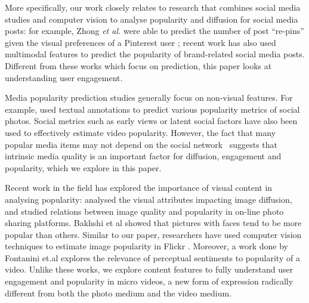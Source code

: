 More specifically, our work closely relates to research that combines social media studies and computer vision to analyse popularity and diffusion for social media posts: for example, Zhong \textsl{et al.} were able to predict the number of post ``re-pins''  given the visual preferences of a Pinterest user \cite{predictingPintrest}; recent work \cite{Mazloom:2016:MPP:2964284.2967210} has also used multimodal features to predict the popularity of brand-related social media posts. Different from these works which focus on prediction,  this paper looks at understanding user engagement. 

Media popularity prediction studies generally focus on non-visual features.  For example, \cite{Yamasaki:2014} used textual annotations to predict various popularity metrics of social photos. Social metrics such as early views \cite{pinto2013using} or latent social factors \cite{nwana2013latent} have also been used to effectively estimate video popularity. However, the fact that many popular media items may not depend on the social  network~\cite{Cha2009Flickr} suggests that intrinsic media quality is an important factor for diffusion, engagement and popularity, which we explore in this paper.

Recent work in the field has explored the importance of visual content in analysing popularity: \cite{totti14impact} analysed the visual attributes impacting image diffusion,  and \cite{schifanella2015image} studied relations between image quality and popularity in on-line photo sharing platforms.  Bakhshi et al  \cite{bakhshi2014faces} showed that pictures with faces tend to be more popular than others. Similar to our paper, researchers have used computer vision techniques to estimate image popularity in Flickr \cite{Khosla:2014}. Moreover, a work done by Fontanini et.al \cite{fontanini2016web} explores the relevance of perceptual sentiments to popularity of a video. 
Unlike these works, we  explore content features to fully understand user engagement and popularity in micro videos, a new form of expression radically different from both the photo medium and the video medium.%

